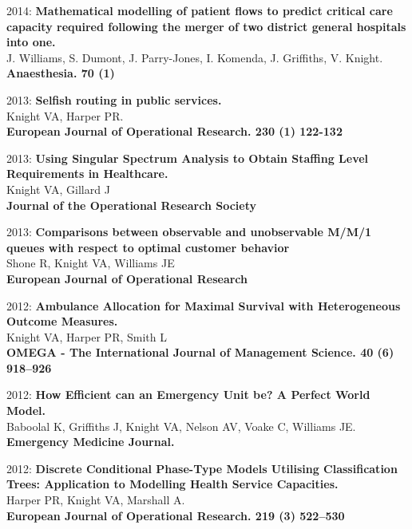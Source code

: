 \documentclass[10pt]{res} %
\begin{document}
\begin{resume}
\begin{etaremune}
\item
2014: \textbf{Mathematical modelling of patient flows to predict critical care capacity required following the merger of two district general hospitals into one.}\\
J. Williams, S. Dumont, J. Parry-Jones, I. Komenda, J. Griffiths, V. Knight.
\\
\textbf{Anaesthesia. 70 (1)}
\\

\item
2013: \textbf{Selfish routing in public services.}\\
Knight VA, Harper PR.
\\
\textbf{European Journal of Operational Research. 230 (1) 122-132}
\\

\item
2013: \textbf{Using Singular Spectrum Analysis to Obtain Staffing Level Requirements in Healthcare.}\\
Knight VA, Gillard J
\\
\textbf{Journal of the Operational Research Society}
\\

\item
2013: \textbf{Comparisons between observable and unobservable M/M/1 queues with respect to optimal customer behavior}\\
Shone R, Knight VA, Williams JE
\\
\textbf{European Journal of Operational Research}
\\

\item
2012: \textbf{Ambulance Allocation for Maximal Survival with Heterogeneous Outcome Measures.}\\
Knight VA, Harper PR, Smith L
\\
\textbf{OMEGA - The International Journal of Management Science. 40 (6) 918--926}
\\

\item
2012: \textbf{How Efficient can an Emergency Unit be? A Perfect World Model.}\\
Baboolal K, Griffiths J, Knight VA, Nelson AV, Voake C, Williams JE.
\\
\textbf{Emergency Medicine Journal.}
\\

\item
2012: \textbf{Discrete Conditional Phase-Type Models Utilising Classification Trees: Application to Modelling Health Service Capacities.}\\
Harper PR, Knight VA, Marshall A.
\\
\textbf{European Journal of Operational Research. 219 (3) 522--530}
\\


\end{etaremune}
\end{resume}
\end{document}
